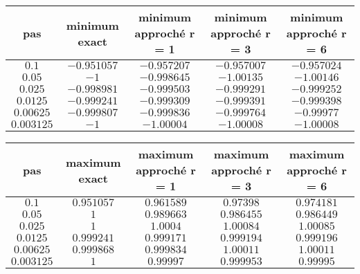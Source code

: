\documentclass[11pt,a4paper]{report}
\begin{document}
				\begin{center}
					\begin{tabular}{|c|c|c|c|c|}
						\hline
						pas & minimum exact & minimum approché r = 1 & minimum approché r = 3 & minimum approché r = 6 \\
						\hline 
						$0.1$ & $-0.951057$ & $-0.957207$ & $-0.957007$ & $-0.957024$  \\ 
						\hline 
						$0.05$ & $-1$ & $-0.998645$ & $-1.00135$ & $-1.00146$\\ 
						\hline 
						$0.025$ & $-0.998981$ & $-0.999503$ & $-0.999291$ & $-0.999252$\\ 
						\hline 
						$0.0125$ & $-0.999241$ & $-0.999309$ & $-0.999391 $ & $-0.999398$\\ 
						\hline
						$0.00625$ & $-0.999807$ & $-0.999836$ & $-0.999764$ & $-0.99977$\\ 
						\hline 
						$0.003125$ & $-1$ & $-1.00004$ & $-1.00008$ & $-1.00008$\\ 
						\hline 
					\end{tabular} 
				\end{center}

				\begin{center}
					\begin{tabular}{|c|c|c|c|c|}
						\hline
						pas & maximum exact & maximum approché r = 1 & maximum approché r = 3 & maximum approché r = 6 \\
						\hline 
						$0.1$ & $ 0.951057 $ & $ 0.961589 $ & $ 0.97398 $ & $ 0.974181 $ \\ 
						\hline 
						$0.05$ & $ 1 $ & $ 0.989663 $ & $ 0.986455 $ & $ 0.986449 $\\ 
						\hline 
						$0.025$ & $ 1 $ & $ 1.0004 $ & $ 1.00084 $ & $ 1.00085 $  \\ 
						\hline 
						$0.0125$ & $ 0.999241 $ & $ 0.999171 $ & $ 0.999194 $ & $ 0.999196 $\\ 
						\hline
						$0.00625$ & $ 0.999868 $ & $ 0.999834 $ & $ 1.00011 $ & $ 1.00011 $ \\ 
						\hline 
						$0.003125$ & $ 1 $ & $ 0.99997 $ & $ 0.999953 $ & $ 0.99995 $ \\ 
						\hline 
					\end{tabular} 
				\end{center}
\end{document}
